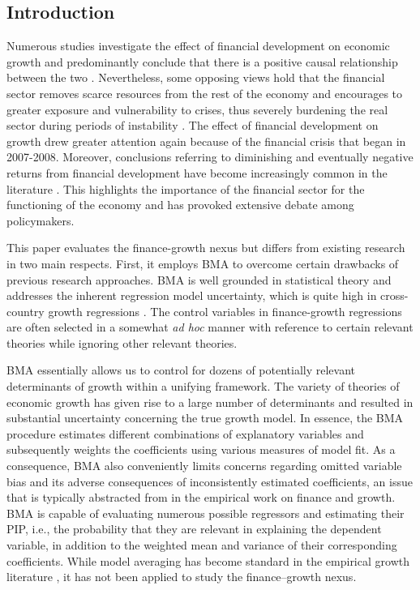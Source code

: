 \begin{refsection}
\section{Introduction}
\label{ch2sec:intro}
Numerous studies investigate the effect of financial development on economic growth and predominantly conclude that there is a positive causal relationship between the two \parencite{KingLevine1993a, LevineZervos1998, AtjeJovanovich1993}. Nevertheless, some opposing views hold that the financial sector removes scarce resources from the rest of the economy \parencite{Tobin1984,Boltonetal2011} and encourages to greater exposure and vulnerability to crises, thus severely burdening the real sector during periods of instability \parencite{Kindelberger1978,Minsky1991,Stiglitz2000}. The effect of financial development on growth drew greater attention again because of the financial crisis that began in 2007-2008. Moreover, conclusions referring to diminishing and eventually negative returns from financial development have become increasingly common in the literature \parencite{Arcandetal2012,CecchettiKharroubi2012,LawSingh2014}. This highlights the importance of the financial sector for the functioning of the economy and has provoked extensive debate among policymakers. 

This paper evaluates the finance-growth nexus but differs from existing research in two main respects. First, it employs \ac{BMA} to overcome certain drawbacks of previous research approaches. \ac{BMA} is well grounded in statistical theory \parencite{Rafteryetal1997} and addresses the inherent regression model uncertainty, which is quite high in cross-country growth regressions \parencite{Fernandezetal2001, SalaiMartinetal2004, Durlaufetal2008}. The control variables in finance-growth regressions are often selected in a somewhat \textit{ad hoc} manner with reference to certain relevant theories while ignoring other relevant theories. 

\ac{BMA} essentially allows us to control for dozens of potentially relevant determinants of growth within a unifying framework. The variety of theories of economic growth has given rise to a large number of determinants and resulted in substantial uncertainty concerning the true growth model. In essence, the \ac{BMA} procedure estimates different combinations of explanatory variables and subsequently weights the coefficients using various measures of model fit. As a consequence, \ac{BMA} also conveniently limits concerns regarding omitted variable bias and its adverse consequences of inconsistently estimated coefficients, an issue that is typically abstracted from in the empirical work on finance and growth. \ac{BMA} is capable of evaluating numerous possible regressors and estimating their \ac{PIP}, i.e., the probability that they are relevant in explaining the dependent variable, in addition to the weighted mean and variance of their corresponding coefficients. While model averaging has become standard in the empirical growth literature \parencite{SalaiMartinetal2004, Durlaufetal2008}, it has not been applied to study the finance--growth nexus.  


\end{refsection}
